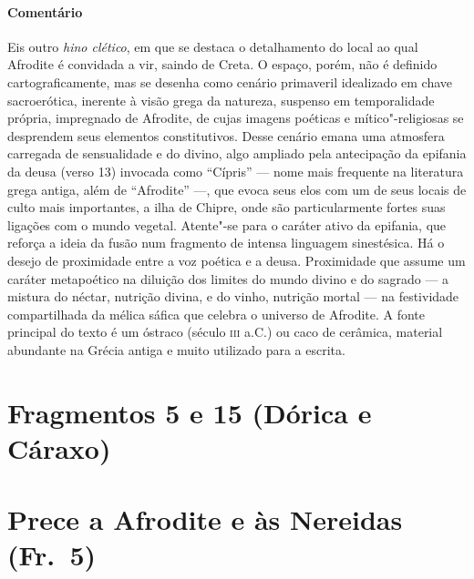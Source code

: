 \pagebreak
{\paragraph{Comentário} Eis outro \textit{hino clético}, em que se destaca o detalhamento do local ao
qual Afrodite é convidada a vir, saindo de Creta. O espaço, porém, não é
definido cartograficamente, mas se desenha como cenário primaveril idealizado
em chave sacroerótica, inerente à visão grega da natureza, suspenso em
temporalidade própria, impregnado de Afrodite, de cujas imagens poéticas e
mítico"-religiosas se desprendem seus elementos constitutivos. Desse cenário
emana uma atmosfera carregada de sensualidade e do divino, algo ampliado pela
antecipação da epifania da deusa (verso 13) invocada como ``Cípris'' ---
nome mais frequente na literatura grega antiga, além de “Afrodite” ---, que evoca
seus elos com um de seus locais de culto mais importantes, a ilha de Chipre,
onde são particularmente fortes suas ligações com o mundo vegetal. Atente"-se
para o caráter ativo da epifania, que reforça a ideia da fusão num fragmento de intensa linguagem sinestésica. Há o desejo de proximidade
entre a voz poética e a deusa. Proximidade que assume um caráter metapoético na diluição dos limites do mundo divino e do sagrado --- a mistura do néctar, nutrição divina, e do vinho, nutrição mortal --- na festividade compartilhada da mélica sáfica que celebra o universo de Afrodite. A fonte principal do texto é um óstraco (século \textsc{iii} a.C.) ou caco de cerâmica, material abundante na Grécia antiga e muito utilizado para a
escrita.}


\pagebreak

\section{Fragmentos 5 e 15 (Dórica e Cáraxo)}

\section{Prece a Afrodite e às Nereidas (Fr.~5)}

